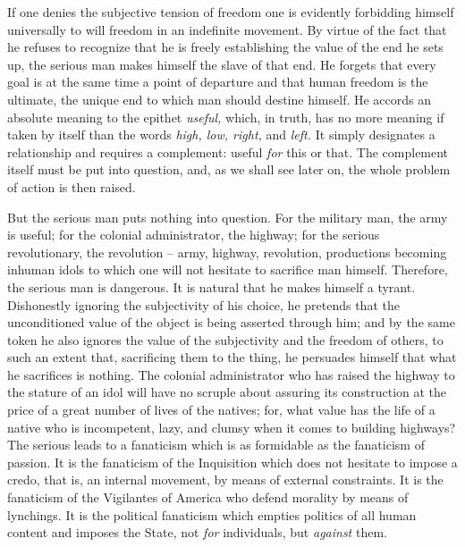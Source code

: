 \documentclass[11pt]{article}
\begin{document}
If one denies the subjective tension of freedom one is evidently forbidding himself universally to will freedom in an indefinite movement. By virtue of the fact that he refuses to recognize that he is freely establishing the value of the end he sets up, the serious man makes himself the slave of that end. He forgets that every goal is at the same time a point of departure and that human freedom is the ultimate, the unique end to which man should destine himself. He accords an absolute meaning to the epithet \textit{useful,} which, in truth, has no more meaning if taken by itself than the words \textit{high, low, right,} and \textit{left.} It simply designates a relationship and requires a complement: useful \textit{for} this or that. The complement itself must be put into question, and, as we shall see later on, the whole problem of action is then raised.

But the serious man puts nothing into question. For the military man, the army is useful; for the colonial administrator, the highway; for the serious revolutionary, the revolution – army, highway, revolution, productions becoming inhuman idols to which one will not hesitate to sacrifice man himself. Therefore, the serious man is dangerous. It is natural that he makes himself a tyrant. Dishonestly ignoring the subjectivity of his choice, he pretends that the unconditioned value of the object is being asserted through him; and by the same token he also ignores the value of the subjectivity and the freedom of others, to such an extent that, sacrificing them to the thing, he persuades himself that what he sacrifices is nothing. The colonial administrator who has raised the highway to the stature of an idol will have no scruple about assuring its construction at the price of a great number of lives of the natives; for, what value has the life of a native who is incompetent, lazy, and clumsy when it comes to building highways? The serious leads to a fanaticism which is as formidable as the fanaticism of passion. It is the fanaticism of the Inquisition which does not hesitate to impose a credo, that is, an internal movement, by means of external constraints. It is the fanaticism of the Vigilantes of America who defend morality by means of lynchings. It is the political fanaticism which empties politics of all human content and imposes the State, not \textit{for} individuals, but \textit{against} them.
\end{document}
